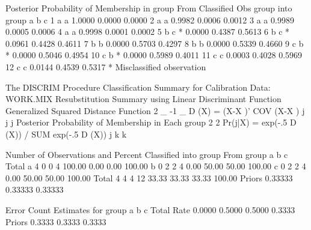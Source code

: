 \documentclass{article}
\begin{document}
\begin{Woutput}
      Posterior Probability of Membership in group
       From      Classified
Obs    group     into group         a         b         c
  1    a         a             1.0000    0.0000    0.0000
  2    a         a             0.9982    0.0006    0.0012
  3    a         a             0.9989    0.0005    0.0006
  4    a         a             0.9998    0.0001    0.0002
  5    b         c        *    0.0000    0.4387    0.5613
  6    b         c        *    0.0961    0.4428    0.4611
  7    b         b             0.0000    0.5703    0.4297
  8    b         b             0.0000    0.5339    0.4660
  9    c         b        *    0.0000    0.5046    0.4954
 10    c         b        *    0.0000    0.5989    0.4011
 11    c         c             0.0003    0.4028    0.5969
 12    c         c             0.0144    0.4539    0.5317
* Misclassified observation

The DISCRIM Procedure
Classification Summary for Calibration Data: WORK.MIX
Resubstitution Summary using Linear Discriminant Function
Generalized Squared Distance Function
 2         _       -1   _
D (X) = (X-X )' COV  (X-X )
 j          j            j
Posterior Probability of Membership in Each group
                   2                    2
Pr(j|X) = exp(-.5 D (X)) / SUM exp(-.5 D (X))
                   j        k           k

 Number of Observations and Percent Classified into group
From
group             a            b            c        Total
a                 4            0            0            4
             100.00         0.00         0.00       100.00
b                 0            2            2            4
               0.00        50.00        50.00       100.00
c                 0            2            2            4
               0.00        50.00        50.00       100.00
Total             4            4            4           12
              33.33        33.33        33.33       100.00
Priors      0.33333      0.33333      0.33333

              Error Count Estimates for group
                       a           b           c       Total
Rate              0.0000      0.5000      0.5000      0.3333
Priors            0.3333      0.3333      0.3333


\end{Woutput}
\end{document}
